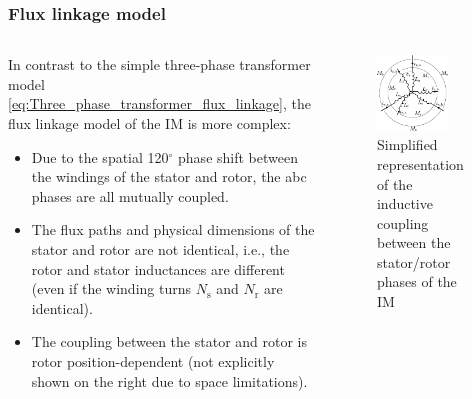 \begin{frame}
	\frametitle{Flux linkage model}
    \begin{columns}
		\begin{column}{0.55\textwidth}
            In contrast to the simple three-phase transformer model \eqref{eq:Three_phase_transformer_flux_linkage}, the flux linkage model of the IM is more complex: 
	       \begin{itemize}
            \item<2-> Due to the spatial 120$^\circ$ phase shift between the windings of the stator and rotor, the abc phases are all mutually coupled. 
            \item<3-> The flux paths and physical dimensions of the stator and rotor are not identical, i.e., the rotor and stator inductances are different (even if the winding turns $N_\mathrm{s}$ and $N_\mathrm{r}$ are identical). 
            \item<4-> The coupling between the stator and rotor is rotor position-dependent (not explicitly shown on the right due to space limitations). 
           \end{itemize}
        \end{column}
        \begin{column}{0.45\textwidth}
                \begin{figure}
                    \centering
                    \includegraphics[width=0.75\textwidth]{fig/lec06/Inductive_coupling_stator_rotor.pdf}
                    \caption{Simplified representation of the inductive coupling between the stator/rotor phases of the IM}
                    \label{fig:Inductive_coupling_stator_rotor_IM}
                \end{figure}
            
        \end{column}
    \end{columns}
\end{frame}

